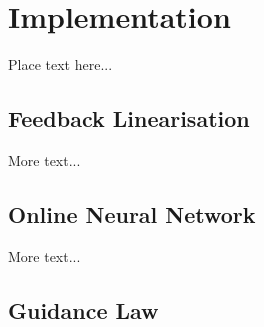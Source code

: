 
\section{Implementation}
\label{sec:imple}

Place text here...


\subsection{Feedback Linearisation}

More text...


\subsection{Online Neural Network}

More text...

\subsection{Guidance Law}